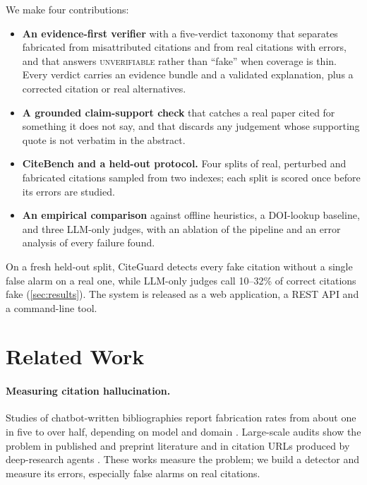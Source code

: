\documentclass[10pt,twocolumn,a4paper]{article}
\newcommand{\verdict}[1]{\textsc{\MakeLowercase{#1}}}
\newcommand{\cg}{CiteGuard}
\begin{document}
We make four contributions:
\begin{itemize}
  \item \textbf{An evidence-first verifier} with a five-verdict taxonomy that separates fabricated
  from misattributed citations and from real citations with errors, and that answers
  \verdict{UNVERIFIABLE} rather than ``fake'' when coverage is thin. Every verdict carries an
  evidence bundle and a validated explanation, plus a corrected citation or real alternatives.
  \item \textbf{A grounded claim-support check} that catches a real paper cited for something it
  does not say, and that discards any judgement whose supporting quote is not verbatim in the
  abstract.
  \item \textbf{CiteBench and a held-out protocol.} Four splits of real, perturbed and fabricated
  citations sampled from two indexes; each split is scored once before its errors are studied.
  \item \textbf{An empirical comparison} against offline heuristics, a DOI-lookup baseline, and three
  LLM-only judges, with an ablation of the pipeline and an error analysis of every failure found.
\end{itemize}
On a fresh held-out split, \cg{} detects every fake citation without a single false alarm on a real
one, while LLM-only judges call 10--32\% of correct citations fake (\cref{sec:results}). The system is released as a web application, a
REST API and a command-line tool.

\section{Related Work}
\label{sec:related}

\paragraph{Measuring citation hallucination.}
Studies of chatbot-written bibliographies report fabrication rates from about one in five to over
half, depending on model and domain
\citep{walters2023fabrication,bhattacharyya2023high,alkaissi2023artificial,chelli2024hallucination}.
Large-scale audits show the problem in published and preprint literature \citep{zhao2026wild} and
in citation URLs produced by deep-research agents \citep{rao2026detecting}. These works measure the
problem; we build a detector and measure its errors, especially false alarms on real citations.
\end{document}
